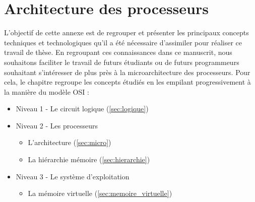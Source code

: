 \chapter{Architecture des processeurs}
\label{chap:sota:materiel} \label{annexe:CHAPITRE_ARCHITECTURE} 


    \minitoc
    \glsresetall


L'objectif de cette annexe est de regrouper et présenter les principaux concepts techniques et technologiques qu'il a été nécessaire d'assimiler pour réaliser ce travail de thèse. En regroupant ces connaissances dans ce manuscrit, nous souhaitons faciliter le travail de futurs étudiants ou de futurs programmeurs souhaitant s'intéresser de plus près à la microarchitecture des processeurs. Pour cela, le chapitre regroupe les concepts étudiés en les empilant progressivement à la manière du modèle OSI \cite{day1983osi} :
\begin{itemize}
    \item Niveau 1 - Le circuit logique (\autoref{sec:logique})
    \item Niveau 2 - Les processeurs 
        \begin{itemize}
            \item L'architecture (\autoref{sec:micro})
            \item La hiérarchie mémoire (\autoref{sec:hierarchie})
        \end{itemize}
    \item Niveau 3 - Le système d'exploitation
        \begin{itemize}
            \item La mémoire virtuelle  (\autoref{sec:memoire_virtuelle})
        \end{itemize}
\end{itemize}


    \iflong
        
        
        
        
        

    \else
        
    \fi 

